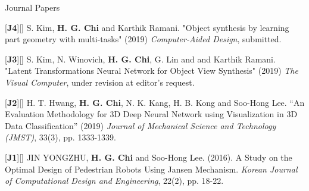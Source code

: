 


\begin{cventries}

\cvpub
{Journal Papers} %
{ %
\begin{cvitems}
\item {[\textbf{J4}][\href{https://docs.google.com/viewer?url=https://github.com/stnoah1/CV/raw/master/documents/cag19.pdf}{}] S. Kim, \textbf{H. G. Chi} and Karthik Ramani. "Object synthesis by learning part geometry with multi-tasks" (2019) \textit{Computer-Aided Design}, submitted.}
\item {[\textbf{J3}][\href{https://docs.google.com/viewer?url=https://github.com/stnoah1/CV/raw/master/documents/VisualComputer.pdf}{}] S. Kim, N. Winovich, \textbf{H. G. Chi}, G. Lin and and Karthik Ramani. "Latent Transformations Neural Network for Object View Synthesis" (2019) \textit{The Visual Computer}, under revision at editor's request.}
\item {[\textbf{J2}][\href{https://link.springer.com/content/pdf/10.1007/s12206-019-0233-1.pdf}{}] H. T. Hwang, \textbf{H. G. Chi}, N. K. Kang, H. B. Kong and Soo-Hong Lee. “An Evaluation Methodology for 3D Deep Neural Network using Visualization in 3D Data Classification” (2019) \textit{Journal of Mechanical Science and Technology (JMST)}, 33(3), pp. 1333-1339.}
\item {[\textbf{J1}][\href{https://docs.google.com/viewer?url=https://github.com/stnoah1/CV/raw/master/documents/Edison.pdf}{}] JIN YONGZHU, \textbf{H. G. Chi} and Soo-Hong Lee. (2016). A Study on the Optimal Design of Pedestrian Robots Using Jansen Mechanism. \textit{Korean Journal of Computational Design and Engineering}, 22(2), pp. 18-22.}
\end{cvitems}
}


\end{cventries}
